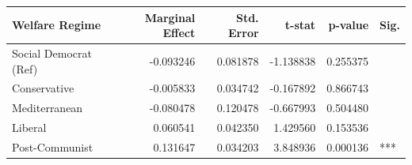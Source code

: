 \begin{tabular}{lrrrrl}
\toprule
Welfare Regime & Marginal Effect & Std. Error & t-stat & p-value & Sig. \\
\midrule
Social Democrat (Ref) & -0.093246 & 0.081878 & -1.138838 & 0.255375 &  \\
Conservative & -0.005833 & 0.034742 & -0.167892 & 0.866743 &  \\
Mediterranean & -0.080478 & 0.120478 & -0.667993 & 0.504480 &  \\
Liberal & 0.060541 & 0.042350 & 1.429560 & 0.153536 &  \\
Post-Communist & 0.131647 & 0.034203 & 3.848936 & 0.000136 & *** \\
\bottomrule
\end{tabular}
